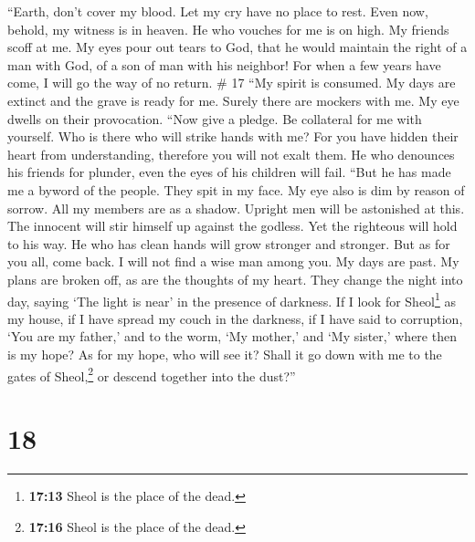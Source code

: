 ``Earth, don't cover my blood. Let my cry have no place to rest.
 Even now, behold, my witness is in heaven. He who
vouches for me is on high.  My friends scoff at me. My
eyes pour out tears to God,  that he would maintain the
right of a man with God, of a son of man with his neighbor!
 For when a few years have come, I will go the way of no
return. \# 17  ``My spirit is consumed. My days are
extinct and the grave is ready for me.  Surely there are
mockers with me. My eye dwells on their provocation. 
``Now give a pledge. Be collateral for me with yourself. Who is there
who will strike hands with me?  For you have hidden their
heart from understanding, therefore you will not exalt them.
 He who denounces his friends for plunder, even the eyes
of his children will fail.  ``But he has made me a byword
of the people. They spit in my face.  My eye also is dim
by reason of sorrow. All my members are as a shadow. 
Upright men will be astonished at this. The innocent will stir himself
up against the godless.  Yet the righteous will hold to
his way. He who has clean hands will grow stronger and stronger.
 But as for you all, come back. I will not find a wise
man among you.  My days are past. My plans are broken
off, as are the thoughts of my heart.  They change the
night into day, saying `The light is near' in the presence of darkness.
 If I look for Sheol\footnote{\textbf{17:13} Sheol is the
  place of the dead.} as my house, if I have spread my couch in the
darkness,  if I have said to corruption, `You are my
father,' and to the worm, `My mother,' and `My sister,' 
where then is my hope? As for my hope, who will see it? 
Shall it go down with me to the gates of Sheol,\footnote{\textbf{17:16}
  Sheol is the place of the dead.} or descend together into the dust?''

\hypertarget{section-12}{%
\section{18}\label{section-12}}

